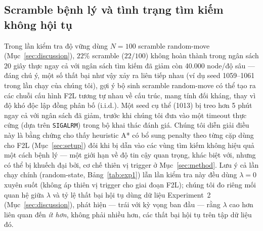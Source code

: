 \documentclass[10pt,conference]{article}
\begin{document}
\subsection{Scramble bệnh lý và tình trạng tìm kiếm không hội tụ}
\label{sec:pathological}
Trong lần kiểm tra độ vững dùng $N=100$ scramble random-move
(Mục~\ref{sec:discussion}), $22\%$ scramble ($22/100$) không hoàn thành trong
ngân sách 20 giây thực ngay cả với ngân sách tìm kiếm đã giảm còn
40.000 node/độ sâu — đáng chú ý, một số thất bại như vậy xảy ra liên
tiếp nhau (ví dụ seed 1059--1061 trong lần chạy của chúng tôi), gợi ý
bộ sinh scramble random-move có thể tạo ra các chuỗi cấu hình F2L
tương tự nhau về cấu trúc, mang tính đối kháng, thay vì độ khó độc lập
đồng phân bố (i.i.d.). Một seed cụ thể (1013) bị treo hơn 5 phút ngay
cả với ngân sách đã giảm, trước khi chúng tôi đưa vào một timeout thực
cứng (dựa trên \texttt{SIGALRM}) trong bộ khai thác đánh giá. Chúng tôi
diễn giải điều này là bằng chứng cho thấy heuristic A* có bổ sung
penalty theo từng cặp dùng cho F2L (Mục~\ref{sec:setup}) đôi khi bị dẫn
vào các vùng tìm kiếm không hiệu quả một cách bệnh lý — một giới hạn về
độ tin cậy quan trọng, khác biệt với, nhưng có thể bị khuếch đại bởi,
cơ chế thiên vị trigger ở Mục~\ref{sec:method}. Lưu ý cả lần chạy chính
(random-state, Bảng~\ref{tab:exp1}) lẫn lần kiểm tra này đều dùng
$\lambda=0$ xuyên suốt (không áp thiên vị trigger cho giai đoạn F2L);
chúng tôi đo riêng mối quan hệ giữa $\lambda$ và tỷ lệ thất bại hội tụ
dùng dữ liệu Experiment~2 (Mục~\ref{sec:discussion}), phát hiện — trái
với kỳ vọng ban đầu — rằng $\lambda$ cao hơn liên quan đến \emph{ít
hơn}, không phải nhiều hơn, các thất bại hội tụ trên tập dữ liệu đó.

\end{document}
